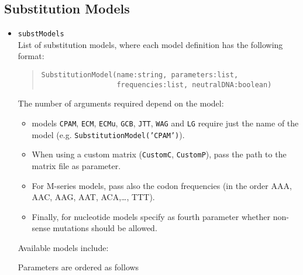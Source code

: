 \documentclass[11pt]{article}
\begin{document}
\subsection{Substitution Models}
\begin{itemize}
\item{\texttt{substModels}} \hfill \\
List of substitution models, where each model definition has the following format:
\begin{quote}
\begin{verbatim}
SubstitutionModel(name:string, parameters:list, 
                  frequencies:list, neutralDNA:boolean)
\end{verbatim}
\end{quote}
The number of arguments required depend on the model:
\begin{itemize}
\item models \texttt{CPAM}, \texttt{ECM}, \texttt{ECMu}, \texttt{GCB}, \texttt{JTT}, \texttt{WAG} and \texttt{LG} require just the name of the model (e.g. \texttt{SubstitutionModel('CPAM')}).
\item When using a custom matrix (\texttt{CustomC}, \texttt{CustomP}), pass the path to the matrix file as parameter.
\item For M-series models, pass also the codon frequencies (in the order AAA, AAC, AAG, AAT, ACA,\ldots, TTT).
\item Finally, for nucleotide models specify as fourth parameter whether non-sense mutations should be allowed.
\end{itemize}
Available models include:
Parameters are ordered as follows
\end{itemize}
\end{document}
